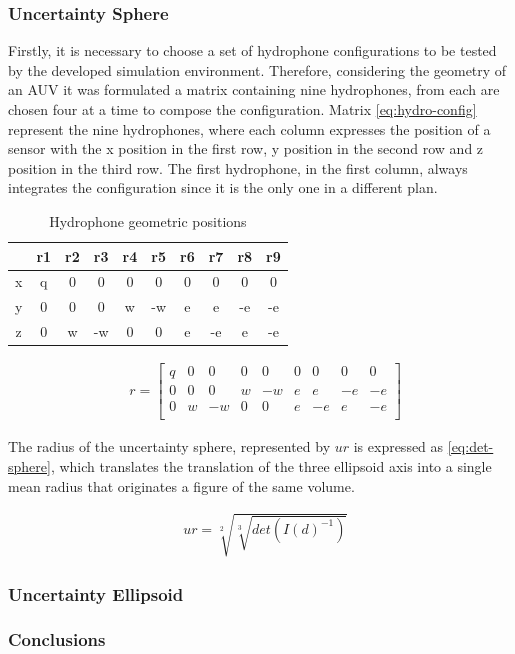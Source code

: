 \subsubsection{Uncertainty Sphere}

Firstly, it is necessary to choose a set of hydrophone configurations to be tested by the developed simulation environment. Therefore, considering the geometry of an AUV it was formulated a matrix containing nine hydrophones, from each are chosen four at a time to compose the configuration. Matrix \ref{eq:hydro-config} represent the nine hydrophones, where each column expresses the position of a sensor with the x position in the first row, y position in the second row and z position in the third row. The first hydrophone, in the first column, always integrates the configuration since it is the only one in a different plan.



\begin{table}[!htbp] %
	\begin{center}
	\begin{tabular}{|c| c c c c c c c c c|}
		\hline
		
		& r1 & r2 & r3 & r4	& r5 & r6 & r7 & r8	& r9 \\ \hline 
		\multirow{1}{0.5em}{x} 
		& q & 0 & 0 & 0 & 0 & 0 & 0 & 0 & 0\\
		\hline 
		\multirow{1}{0.5em}{y} 
		& 0 & 0 & 0 & w & -w & e & e & -e & -e\\
		\hline 
		\multirow{1}{0.5em}{z} 
		& 0 & w & -w & 0 & 0 & e & -e & e & -e \\
		\hline 
	\end{tabular}
	\caption{Hydrophone geometric positions}
	\label{tab:config-9h}
\end{center}
\end{table}



\begin{eqnarray}
& r = 
\begin{bmatrix}
q & 0 & 0 & 0 & 0 & 0 & 0 & 0 & 0  \\
0 & 0 & 0 & w & -w & e & e & -e & -e \\
0 & w & -w & 0 & 0 & e & -e & e & -e \\
\end{bmatrix}
\label{eq:hydro-config}
\end{eqnarray}

The radius of the uncertainty sphere, represented by $ur$ is expressed as \ref{eq:det-sphere}, which translates the translation of the three ellipsoid axis into a single mean radius that originates a figure of the same volume.

\begin{eqnarray}
& ur = \sqrt[2]{\sqrt[3]{det(I(d)^{-1})}}
\label{eq:det-sphere}
\end{eqnarray}



\subsubsection{Uncertainty Ellipsoid}

\subsubsection{Conclusions}
